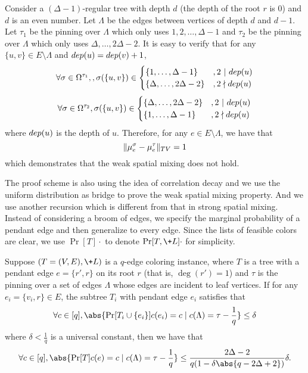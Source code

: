 \begin{example}\label{eg:hardness_WSM}
    Consider a $(\Delta - 1)$-regular tree with depth $d$ (the depth of the root $r$ is $0$) and $d$ is an even number. Let $\Lambda$ be the edges between vertices of depth $d$ and $d-1$. Let $\tau_1$ be the pinning over $\Lambda$ which only uses $1,2,\dots,\Delta-1$ and $\tau_2$ be the pinning over $\Lambda$ which only uses $\Delta,\dots,2\Delta - 2$. It is easy to verify that for any $\{u,v\}\in E\setminus \Lambda$ and $\-{dep}(u) = \-{dep}(v) + 1$,
    $$
        \forall \sigma \in \Omega^{\tau_1}, , \sigma(\{u,v\}) \in 
        \begin{cases}
            \{1,\dots,\Delta-1\} &, 2\ |\ \-{dep}(u)
            \\\{\Delta,\dots,2\Delta-2\} &, 2 \nmid \-{dep}(u)
        \end{cases}
    $$
    $$
        \forall \sigma \in \Omega^{\tau_2}, \sigma(\{u,v\}) \in 
        \begin{cases}
            \{\Delta,\dots,2\Delta-2\} &, 2\ |\ \-{dep}(u)
            \\\{1,\dots,\Delta-1\} &, 2 \nmid \-{dep}(u)
        \end{cases}
    $$
    where $\-{dep}(u)$ is the depth of $u$. Therefore, for any $e\in E\setminus \Lambda$, we have that
    $$
        \|\mu_e^\sigma - \mu_e^\tau\|_{\-{TV}} = 1
    $$
    which demonstrates that the weak spatial mixing does not hold.
\end{example}
The proof scheme is also using the idea of correlation decay and we use the uniform distribution as bridge to prove the weak spatial mixing property. And we use another recursion which is different from that in strong spatial mixing.
Instead of considering a broom of edges, we specify the marginal probability of a pendant edge and then generalize to every edge.
Since the lists of feasible colors are clear, we use $\Pr[T]{\cdot}$ to denote $\Pr[T,\+L]{\cdot}$ for simplicity.
\begin{lemma}\label{lem:WSM_contraction}
Suppose $(T = (V,E), \+L)$ is a $q$-edge coloring instance, where $T$ is a tree with a pendant edge $e = \{r',r\}$ on its root $r$ (that is, $\deg(r')=1$) and $\tau$ is the pinning over a set of edges $\Lambda$ whose edges are incident to leaf vertices.  
If for any $e_i = \{v_i,r\}\in E$, the subtree $T_i$ with pendant edge $e_i$ satisfies that 
$$
    \forall c\in[q], \abs{\Pr[T_i\cup \{e_i\}]{c(e_i) = c\mid c(\Lambda) = \tau} - \frac 1q} \leq \delta
$$
where $\delta < \frac 1q$ is a universal constant, then we have that
$$
    \forall c\in [q], \abs{\Pr[T]{c(e) = c\mid c(\Lambda) = \tau} - \frac 1q} \leq \frac{2\Delta - 2}{q(1 - \delta\abs{q-2\Delta + 2})} \delta.
$$
\end{lemma}
